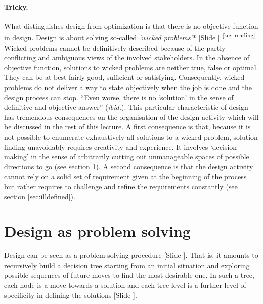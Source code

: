 \documentclass{article}
\newcounter{slide}
\begin{document}
\paragraph{Tricky.} What distinguishes design from optimization is that there is no objective function in design. Design is about solving so-called \emph{`wicked problems'}* {\color{blue}[Slide ]} \cite{rittelDilemmasGeneralTheory1973}\textsuperscript{\color{Magenta}[key reading]}. Wicked problems cannot be definitively described because of the partly conflicting and ambiguous views of the involved stakeholders. In the absence of objective function, solutions to wicked problems are neither true, false or optimal. They can be at best fairly good, sufficient or satisfying. Consequently, wicked problems do not deliver a way to state objectively when the job is done and the design process can stop. ``Even worse, there is no `solution' in the sense of definitive and objective answer'' (\emph{ibid.}). This particular characteristic of design has tremendous consequences on the organisation of the design activity which will be discussed in the rest of this lecture. A first consequence is that, because it is not possible to enumerate exhaustively all solutions to a wicked problem, solution finding unavoidably requires creativity and experience. It involves `decision making' in the sense of arbitrarily cutting out unmanageable spaces of possible directions to go (see section \ref{sec:GeneralProblemSolving}). A second consequence is that the design activity cannot rely on a solid set of requirement given at the beginning of the process but rather requires to challenge and refine the requirements constantly (see section \ref{sec:illdefined}). 

\section{Design as problem solving}
\label{sec:GeneralProblemSolving}
Design can be seen as a problem solving procedure {\color{blue}[Slide ]}. That is, it amounts to recursively build a decision tree starting from an initial situation and exploring possible sequences of future moves to find the most desirable one. In such a tree, each node is a move towards a solution and each tree level is a further level of specificity in defining the solutions {\color{blue}[Slide ]}. 
\end{document}
